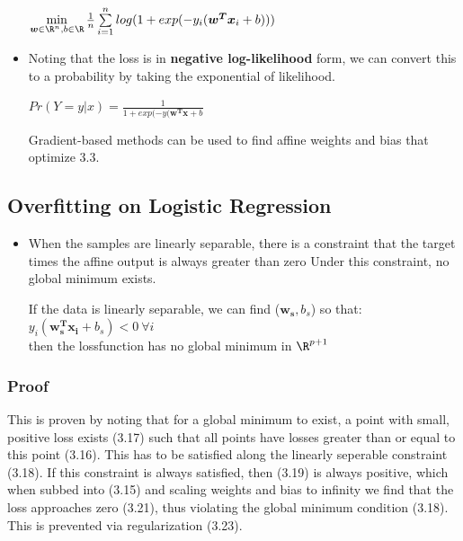 \documentclass[english]{latex4ei/latex4ei_sheet}
\begin{document}
\begin{sectionbox}
\begin{itemize}
\begin{center}
\begin{emphbox}
    $\min\limits_{\boldsymbol{w}\in\R^n,b\in\R}\frac{1}{n}\sum\limits_{i=1}^nlog(1+exp(-y_i(\boldsymbol{w^Tx}_i+b)))$
    \end{emphbox}
\end{center}
\item Noting that the loss is in \textbf{negative log-likelihood} form, we can convert this to a probability by taking the exponential of likelihood.
\begin{emphbox}
    \begin{center}
        $Pr(Y=y|x)=\frac{1}{1+exp(-y(\boldsymbol{w^Tx}+b}$
    \end{center}
\end{emphbox}
Gradient-based methods can be used to find affine weights and bias that optimize 3.3.
\end{itemize}
\subsection{Overfitting on Logistic Regression}
\begin{itemize}
\item When the samples are linearly separable, there is a constraint that the target times the affine output is always greater than zero Under this constraint, no global minimum exists.
\begin{emphbox}
    If the data is linearly separable, we can find ($\boldsymbol{w_s},b_s$) so that: $y_i(\boldsymbol{w_s^Tx_i}+b_s)<0 \ \forall i$\\
    then the lossfunction has no global minimum in $\R^{p+1}$
\end{emphbox}
\end{itemize}

\subsubsection{Proof}
This is proven by noting that for a global minimum to exist, a point with small, positive loss exists (3.17) such that all points have losses greater than or equal to this point (3.16). This has to be satisfied along the linearly seperable constraint (3.18). If this constraint is always satisfied, then (3.19) is always positive, which when subbed into (3.15) and scaling weights and bias to infinity we find that the loss approaches zero (3.21), thus violating the global minimum condition (3.18). This is prevented via regularization (3.23).
\end{sectionbox}
\end{document}
